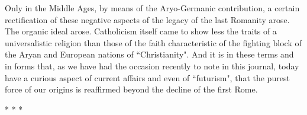 Only in the Middle Ages, by means of the Aryo-Germanic contribution, a certain rectification of these negative aspects of the legacy of the last Romanity arose. The organic ideal arose. Catholicism itself came to show less the traits of a universalistic religion than those of the faith characteristic of the fighting block of the Aryan and European nations of ``Christianity". And it is in these terms and in forms that, as we have had the occasion recently to note in this journal, today have a curious aspect of current affairs and even of ``futurism", that the purest force of our origins is reaffirmed beyond the decline of the first Rome.


\begin{center}* * *\end{center}

